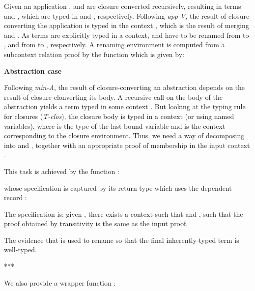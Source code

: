 \documentclass[bsc,frontabs,oneside,singlespacing,parskip,deptreport]{infthesis}
\theoremstyle{definition}
\theoremstyle{lemma}
\begin{document}
Given an application ,  and  are closure
converted recursively, resulting in terms  and , which
are typed in  and , respectively. Following
\textit{app-V}, the result of closure-converting the application is
typed in the context , which is the result of merging 
and . As terms are explicitly typed in a context,  and
 have to be renamed from  to , and from 
to , respectively. A renaming environment is computed from a
subcontext relation proof by the function  which is given by:


\textbf{Abstraction case}


Following \textit{min-A}, the result of closure-converting an
abstraction depends on the result  of closure-clonverting its
body. A recursive call on the body of the abstraction yields a term
typed in some context . But looking at the typing rule for
closures (\textit{T-clos}), the closure body is typed in a context
 (or  using named variables), where  is
the type of the last bound variable and  is the context
corresponding to the closure environment. Thus, we need a way of
decomposing  into  and , together with an
appropriate proof of membership in the input context .

This task is achieved by the function :


whose specification is captured by its return type which uses the
dependent record :


The specification is: given , there exists a context
 such that  and , such that the
proof  obtained by transitivity is the same as the input
proof.

The evidence that  is used to rename  so that
the final inherently-typed term is well-typed.

***

We also provide a wrapper function :
\end{document}
